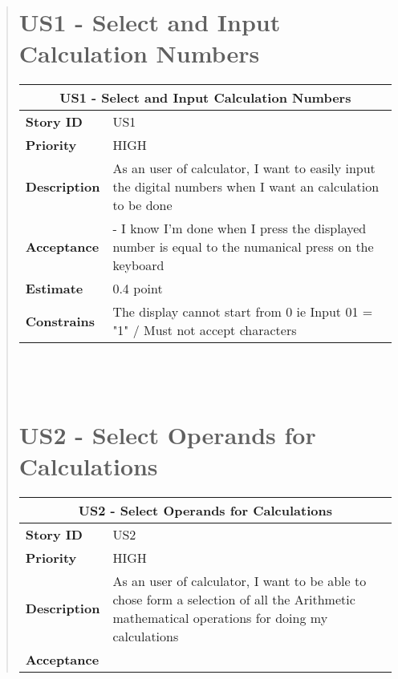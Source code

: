\documentclass[12pt]{report}
\begin{document}
\begin{quote}
                \section{US1 - Select and Input Calculation Numbers}
                
                \begin{tabular}{ |p{4cm}|p{10cm}| }
                 \hline
                 \multicolumn{2}{|c|}{\textbf{US1 - Select and Input Calculation Numbers}} \\
                 \hline
                 \textbf {Story ID}& US1  \\
                 \hline
                 \textbf{Priority} & HIGH \\
                 \hline
                 \textbf{Description}   & As an user of calculator, I want to easily input the digital numbers when I want an calculation to be done  \\
                 \hline
                 \textbf{Acceptance}& 
                
                 - I know I'm done when I press the displayed number is equal to the numanical press on the keyboard
                
                \\
                 \hline
                 \textbf{Estimate} &  0.4  point  \\
                 \hline
                 \textbf{Constrains}& The display cannot start from 0 ie Input 01 = "1" / Must not accept characters  \\
                 \hline
                \end{tabular}
            \hfill\break\\\\
                
        
        
        
        
        \section{US2 - Select Operands for Calculations}
                \begin{tabular}{ |p{4cm}|p{10cm}| }
                 \hline
                 \multicolumn{2}{|c|}{\textbf{US2 - Select Operands for Calculations}} \\
                 \hline
                 \textbf {Story ID}& US2  \\
                 \hline
                 \textbf{Priority} & HIGH \\
                 \hline
                 \textbf{Description}   &  As an user of calculator, I want to be able to chose form a selection of all the Arithmetic mathematical operations for doing my calculations   \\
                 \hline
                 \textbf{Acceptance}& 
                

\end{tabular}
\end{quote}
\end{document}
